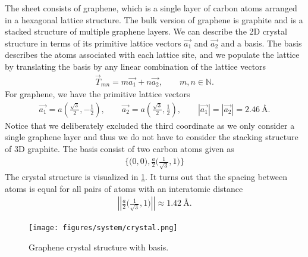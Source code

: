 The sheet consists of graphene, which is a single layer of carbon atoms arranged in a hexagonal lattice structure. The bulk version of graphene is graphite and is a stacked structure of multiple graphene layers. We can describe the 2D crystal structure in terms of its primitive lattice vectors $\vec{a_1}$ and $\vec{a_2}$ and a basis. The basis describes the atoms associated with each lattice site, and we populate the lattice by translating the basis by any linear combination of the lattice vectors 
\begin{align*}
  \vec{T}_{mn} = m\vec{a_1} + n\vec{a_2}, \qquad m,n \in \mathbb{N}.
\end{align*}
For graphene, we have the primitive lattice vectors 
\begin{align*}
  \vec{a_1} = a \left(\frac{\sqrt{3}}{2}, -\frac{1}{2}\right), \qquad \vec{a_2} = a \left(\frac{\sqrt{3}}{2}, \frac{1}{2}\right), \qquad |\vec{a_1}| = |\vec{a_2}| = 2.46 \ \text{Å}.
\end{align*}
Notice that we deliberately excluded the third coordinate as we only consider a
single graphene layer and thus we do not have to consider the stacking structure of 3D graphite. The basis consist of two carbon atoms given as 
\begin{align*}
  \Big\{\Big(0,0\Big), \frac{a}{2}\Big(\frac{1}{\sqrt{3}}, 1 \Big) \Big\}
\end{align*}
The crystal structure is visualized in \cref{fig:graphene_crystal}. It turns out that the spacing between atoms is equal for all pairs of atoms with an interatomic distance
\begin{align*}
  \left|\left|\frac{a}{2}\Big(\frac{1}{\sqrt{3}}, 1 \Big)\right|\right| \approx 1.42 \ \text{Å}.
\end{align*}


\begin{figure}[H]
  \centering
  \texttt{[image: figures/system/crystal.png]}
  \caption{Graphene crystal structure with basis.}
  \label{fig:graphene_crystal}
\end{figure}



